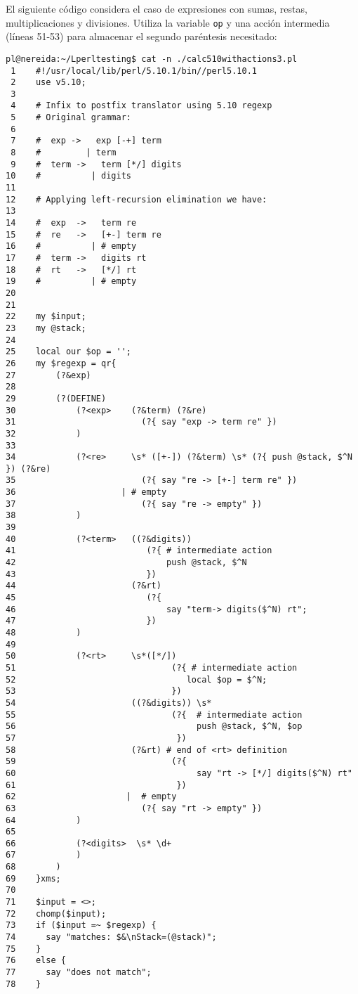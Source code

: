 El siguiente código considera el caso de expresiones con sumas, restas, multiplicaciones
y divisiones. Utiliza la variable \verb|op| y una acción intermedia (líneas 51-53) 
para almacenar el segundo paréntesis necesitado:
\begin{latexonly}
\begin{verbatim}
pl@nereida:~/Lperltesting$ cat -n ./calc510withactions3.pl
 1    #!/usr/local/lib/perl/5.10.1/bin//perl5.10.1
 2    use v5.10;
 3  
 4    # Infix to postfix translator using 5.10 regexp
 5    # Original grammar:
 6  
 7    #  exp ->   exp [-+] term
 8    #         | term
 9    #  term ->   term [*/] digits
10    #          | digits
11  
12    # Applying left-recursion elimination we have:
13  
14    #  exp  ->   term re
15    #  re   ->   [+-] term re
16    #          | # empty
17    #  term ->   digits rt
18    #  rt   ->   [*/] rt
19    #          | # empty
20  
21  
22    my $input;
23    my @stack;
24  
25    local our $op = '';
26    my $regexp = qr{
27        (?&exp)
28  
29        (?(DEFINE)
30            (?<exp>    (?&term) (?&re)
31                         (?{ say "exp -> term re" })
32            )
33  
34            (?<re>     \s* ([+-]) (?&term) \s* (?{ push @stack, $^N }) (?&re)
35                         (?{ say "re -> [+-] term re" })
36                     | # empty
37                         (?{ say "re -> empty" })
38            )
39  
40            (?<term>   ((?&digits))
41                          (?{ # intermediate action
42                              push @stack, $^N
43                          })
44                       (?&rt)
45                          (?{
46                              say "term-> digits($^N) rt";
47                          })
48            )
49  
50            (?<rt>     \s*([*/])
51                               (?{ # intermediate action
52                                  local $op = $^N;
53                               })
54                       ((?&digits)) \s*
55                               (?{  # intermediate action
56                                    push @stack, $^N, $op
57                                })
58                       (?&rt) # end of <rt> definition
59                               (?{
60                                    say "rt -> [*/] digits($^N) rt"
61                                })
62                      |  # empty
63                         (?{ say "rt -> empty" })
64            )
65  
66            (?<digits>  \s* \d+
67            )
68        )
69    }xms;
70  
71    $input = <>;
72    chomp($input);
73    if ($input =~ $regexp) {
74      say "matches: $&\nStack=(@stack)";
75    }
76    else {
77      say "does not match";
78    }
\end{verbatim}
\end{latexonly}
